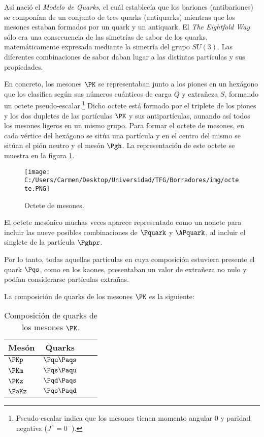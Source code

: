 
Así nació el \textit{Modelo de Quarks}, el cuál establecía que los bariones (antibariones) se componían de un conjunto de tres quarks (antiquarks) mientras que los mesones estaban formados por un quark y un antiquark. El \textit{The Eightfold Way} sólo era una consecuencia de las simetrías de sabor de los quarks, matemáticamente expresada mediante la simetría del grupo $SU(3)$. Las diferentes combinaciones de sabor daban lugar a las distintas partículas y sus propiedades.

En concreto, los mesones $\PK$ se representaban junto a los piones en un hexágono que los clasifica según sus números cuánticos de carga $Q$ y extrañeza $S$, formando un octete pseudo-escalar.\footnote{Pseudo-escalar indica que los mesones tienen momento angular 0 y paridad negativa ($J^\pi = 0^-$).} Dicho octete está formado por el triplete de los piones y los dos dupletes de las partículas $\PK$ y sus antipartículas, aunando así todos los mesones ligeros en un mismo grupo. Para formar el octete de mesones, en cada vértice del hexágono se sitúa una partícula y en el centro del mismo se sitúan el pión neutro y el mesón $\Pgh$. La representación de este octete se muestra en la figura \ref{fig:octete}.

\begin{figure}[h!]
	\centering
	\texttt{[image: C:/Users/Carmen/Desktop/Universidad/TFG/Borradores/img/octete.PNG]}
	\caption[Octete de mesones]
	{Octete de mesones. \cite{Griffiths2008}}
	\label{fig:octete}
\end{figure}

El octete mesónico muchas veces aparece representado como un nonete para incluir las nueve posibles combinaciones de $\Pquark$ y $\APquark$, al incluir el singlete de la partícula $\Pghpr$.

Por lo tanto, todas aquellas partículas en cuya composición estuviera presente el quark $\Pqs$, como en los kaones, presentaban un valor de extrañeza no nulo y podían considerarse partículas extrañas. 

La composición de quarks de los mesones $\PK$ es la siguiente:

\begin{table}[h!]
	\centering
	\begin{tabular}{l*{2}{c}r}
\hline
Mesón & Quarks\\ 
\hline
$\PKp$ & $\Pqu\Paqs$\\
$\PKm$ & $\Pqs\Paqu$\\
$\PKz$ & $\Pqd\Paqs$\\
$\PaKz$ & $\Pqs\Paqd$\\
\hline
	\end{tabular}
\caption[Composición de quarks de los mesones $\PK$]{Composición de quarks de los mesones $\PK$. \cite{notas2020}} 
\label{tab:mesonesK_quarks}
\end{table}


